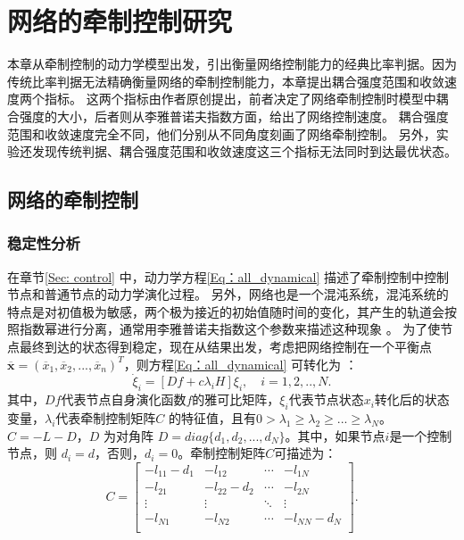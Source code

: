 \section{网络的牵制控制研究}

本章从牵制控制的动力学模型出发，引出衡量网络控制能力的经典比率判据。因为传统比率判据无法精确衡量网络的牵制控制能力，本章提出耦合强度范围和收敛速度两个指标。
这两个指标由作者原创提出，前者决定了网络牵制控制时模型中耦合强度的大小，后者则从李雅普诺夫指数方面，给出了网络控制速度。
耦合强度范围和收敛速度完全不同，他们分别从不同角度刻画了网络牵制控制。
另外，实验还发现传统判据、耦合强度范围和收敛速度这三个指标无法同时到达最优状态。

\subsection{网络的牵制控制}
\subsubsection{稳定性分析}

在章节\ref{Sec: control} 中，动力学方程\ref{Eq：all_dynamical} 描述了牵制控制中控制节点和普通节点的动力学演化过程。
另外，网络也是一个混沌系统，混沌系统的特点是对初值极为敏感，两个极为接近的初始值随时间的变化，其产生的轨道会按照指数幂进行分离，通常用李雅普诺夫指数这个参数来描述这种现象 \cite{Wolf1985}。
为了使节点最终到达的状态得到稳定，现在从结果出发，考虑把网络控制在一个平衡点$\overline{\textbf{x}} = (\overline{x}_1, \overline{x}_2, ..., \overline{x}_n)^T$，则方程\ref{Eq：all_dynamical} 可转化为 \cite{汪小帆2006}：
\begin{equation}
\dot{\xi}_i = [Df+c{\lambda}_iH]{\xi}_i,\quad i=1,2,..,N
\label{Eq: Reduce_MSF}.
\end{equation}
其中，$ Df $代表节点自身演化函数$ f $的雅可比矩阵，$ \xi_i $代表节点状态$x_i$转化后的状态变量，$ {\lambda}_i $代表牵制控制矩阵$ C $ 的特征值，且有$ 0 > {\lambda}_1 \geq {\lambda}_2 \geq ... \geq {\lambda}_N$。$ C=-L-D $，$ D $ 为对角阵 $ D=diag\{d_1,d_2,...,d_N\} $。其中，如果节点$ i $是一个控制节点，则 $ d_i=d $，否则，$ d_i=0 $。牵制控制矩阵$ C $可描述为：
\begin{equation}
C=
\left[
\begin{matrix}
-l_{11}-d_1      & -l_{12}       & \cdots & -l_{1N}       \\
-l_{21}       & -l_{22} -d_2      & \cdots & -l_{2N}      \\
\vdots & \vdots & \ddots & \vdots \\
-l_{N1}       & -l_{N2}       & \cdots & -l_{NN}-d_N       \\
\end{matrix}
\right].
\label{Eq: C}
\end{equation}


